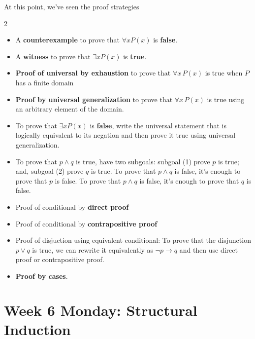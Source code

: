 At this point, we've seen the proof strategies
\begin{multicols}{2}
    \begin{itemize}
        \item A {\bf counterexample} to prove that  $\forall x P(x)$ is {\bf false}.
        \item  A {\bf witness} to prove that  $\exists x P(x)$ is {\bf true}.
        \item {\bf Proof of universal by exhaustion} to prove that $\forall x \, P(x)$
    is true when $P$ has a finite domain
        \item  {\bf Proof by universal generalization} to prove that $\forall x \, P(x)$
    is true using an arbitrary element of the domain.
        \item To  prove  that $\exists x P(x)$ is {\bf false}, write the universal statement that is 
        logically equivalent to its negation and then prove it true using universal generalization.
        \item To prove that $p \land q$ is true, have two subgoals: 
        subgoal (1) prove $p$ is  true; and, subgoal (2) prove $q$ is true. To prove that $p \land q$ is false, it's enough to prove that $p$ is false.
     To prove that $p \land q$ is false, it's enough to prove that $q$ is false.
        \item Proof of conditional by {\bf direct proof}
        \item Proof of conditional by {\bf contrapositive proof}
        \item Proof of disjuction using equivalent conditional: To prove that the 
        disjunction $p \lor q$ is true, we can rewrite it equivalently as $\lnot p \to q$ and
        then use direct proof or contrapositive proof.
        \item {\bf Proof by cases}.
    \end{itemize}
\end{multicols}


\newpage

\newpage

\section*{Week 6 Monday: Structural Induction}



\newpage

\newpage



